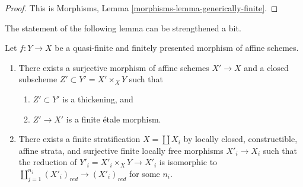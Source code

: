 \begin{proof}
This is Morphisms, Lemma \ref{morphisms-lemma-generically-finite}.
\end{proof}

\noindent
The statement of the following lemma can be strengthened a bit.

\begin{lemma}
\label{lemma-decompose-quasi-finite-morphism}
Let $f : Y \to X$ be a quasi-finite and finitely presented
morphism of affine schemes.
\begin{enumerate}
\item There exists a surjective morphism of affine schemes $X' \to X$ and a
closed subscheme $Z' \subset Y' = X' \times_X Y$ such that
\begin{enumerate}
\item $Z' \subset Y'$ is a thickening, and
\item $Z' \to X'$ is a finite \'etale morphism.
\end{enumerate}
\item There exists a finite stratification $X = \coprod X_i$ by
locally closed, constructible, affine strata, and surjective finite locally
free morphisms $X'_i \to X_i$ such that the reduction of
$Y'_i = X'_i \times_X Y \to X'_i$ is isomorphic to
$\coprod_{j = 1}^{n_i} (X'_i)_{red} \to (X'_i)_{red}$ for some $n_i$.
\end{enumerate}
\end{lemma}

